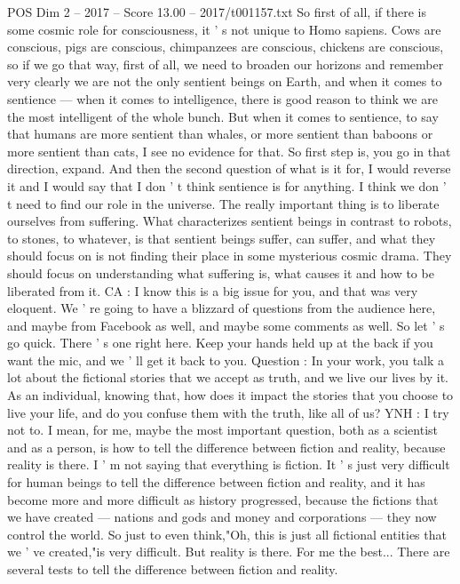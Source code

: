 \begin{textsample}{POS Dim 2 – 2017 – Score 13.00 – 2017/t001157.txt}
So first of all, if there is some cosmic role for consciousness, it ' s not unique to Homo sapiens.
Cows are conscious, pigs are conscious, chimpanzees are conscious, chickens are conscious, so if we go that way, first of all, we need to broaden our horizons and remember very clearly we are not the only sentient beings on Earth, and when it comes to sentience — when it comes to intelligence, there is good reason to think we are the most intelligent of the whole bunch.
But when it comes to sentience, to say that humans are more sentient than whales, or more sentient than baboons or more sentient than cats, I see no evidence for that.
So first step is, you go in that direction, expand.
And then the second question of what is it for, I would reverse it and I would say that I don ' t think sentience is for anything.
I think we don ' t need to find our role in the universe.
The really important thing is to liberate ourselves from suffering.
What characterizes sentient beings in contrast to robots, to stones, to whatever, is that sentient beings suffer, can suffer, and what they should focus on is not finding their place in some mysterious cosmic drama.
They should focus on understanding what suffering is, what causes it and how to be liberated from it.
CA : I know this is a big issue for you, and that was very eloquent.
We ' re going to have a blizzard of questions from the audience here, and maybe from Facebook as well, and maybe some comments as well.
So let ' s go quick.
There ' s one right here.
Keep your hands held up at the back if you want the mic, and we ' ll get it back to you.
Question : In your work, you talk a lot about the fictional stories that we accept as truth, and we live our lives by it.
As an individual, knowing that, how does it impact the stories that you choose to live your life, and do you confuse them with the truth, like all of us?
YNH : I try not to.
I mean, for me, maybe the most important question, both as a scientist and as a person, is how to tell the difference between fiction and reality, because reality is there.
I ' m not saying that everything is fiction.
It ' s just very difficult for human beings to tell the difference between fiction and reality, and it has become more and more difficult as history progressed, because the fictions that we have created — nations and gods and money and corporations — they now control the world.
So just to even think,"Oh, this is just all fictional entities that we ' ve created,"is very difficult.
But reality is there.
For me the best...
There are several tests to tell the difference between fiction and reality.

\end{textsample}
